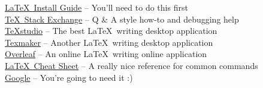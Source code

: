 \href{https://www.latex-tutorial.com/installation/}{\LaTeX\ Install Guide}
-- You'll need to do this first\\
\href{https://tex.stackexchange.com/questions/9363}{\TeX\ Stack Exchange}
-- Q \& A style how-to and debugging help\\
\href{https://www.texstudio.org/}{TeXstudio}
-- The best \LaTeX\ writing desktop application\\
\href{http://www.xm1math.net/texmaker/}{Texmaker}
-- Another \LaTeX\ writing desktop application\\
\href{https://www.overleaf.com/}{Overleaf}
-- An online \LaTeX\ writing online application\\
\href{https://wch.github.io/latexsheet/latexsheet.pdf}{\LaTeX\ Cheat Sheet}
-- A really nice reference for common commands\\
\href{https://www.youtube.com/watch?v=dQw4w9WgXcQ}{Google}
-- You're going to need it :)\\
